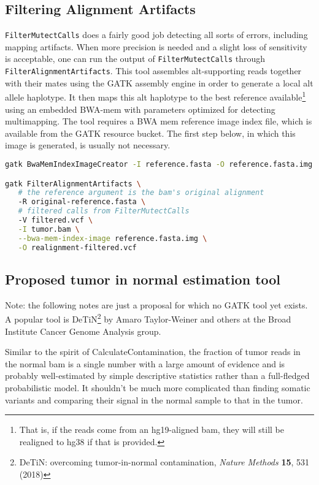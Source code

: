 \documentclass[nofootinbib,amssymb,amsmath]{revtex4}
\newcommand{\code}[1]{\texttt{#1}}
\begin{document}
\subsection{Filtering Alignment Artifacts}
\code{FilterMutectCalls} does a fairly good job detecting all sorts of errors, including mapping artifacts.  When more precision is needed and a slight loss of sensitivity is acceptable, one can run the output of \code{FilterMutectCalls} through \code{FilterAlignmentArtifacts}.  This tool assembles alt-supporting reads together with their mates using the GATK assembly engine in order to generate a local alt allele haplotype.  It then maps this alt haplotype to the best reference available\footnote{That is, if the reads come from an hg19-aligned bam, they will still be realigned to hg38 if that is provided.} using an embedded BWA-mem with parameters optimized for detecting multimapping.  The tool requires a BWA mem reference image index file, which is available from the GATK resource bucket.  The first step below, in which this image is generated, is usually not necessary.

\begin{lstlisting}[language=bash,caption={FilterAlignmentArtifacts command}, label={cmd-filter-alignment-artifacts}]
gatk BwaMemIndexImageCreator -I reference.fasta -O reference.fasta.img

gatk FilterAlignmentArtifacts \
   # the reference argument is the bam's original alignment
   -R original-reference.fasta \
   # filtered calls from FilterMutectCalls
   -V filtered.vcf \
   -I tumor.bam \
   --bwa-mem-index-image reference.fasta.img \
   -O realignment-filtered.vcf
\end{lstlisting}


\subsection{Proposed tumor in normal estimation tool}

Note: the following notes are just a proposal for which no GATK tool yet exists.  A popular tool is DeTiN\footnote{DeTiN: overcoming tumor-in-normal contamination, \textit{Nature Methods} \textbf{15}, 531 (2018)} by Amaro Taylor-Weiner and others at the Broad Institute Cancer Genome Analysis group.

Similar to the spirit of CalculateContamination, the fraction of tumor reads in the normal bam is a single number with a large amount of evidence and is probably well-estimated by simple descriptive statistics rather than a full-fledged probabilistic model.  It shouldn't be much more complicated than finding somatic variants and comparing their signal in the normal sample to that in the tumor.
\end{document}
